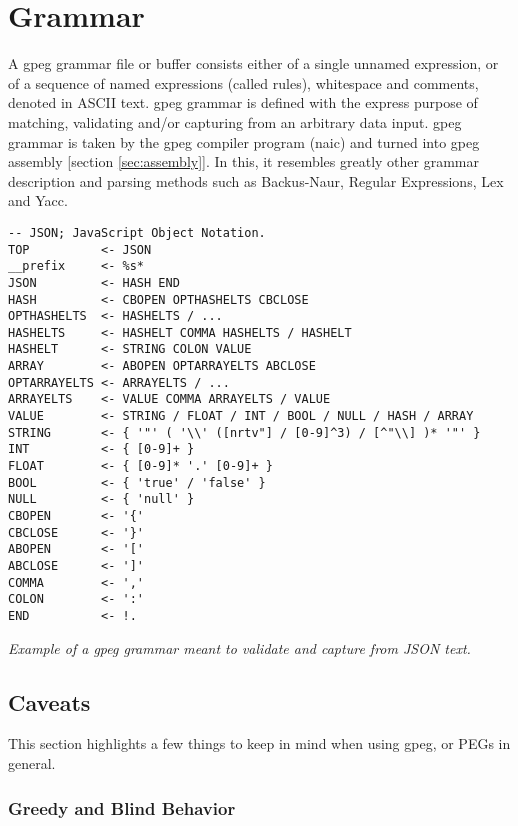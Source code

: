 \section{Grammar}
\label{sec:grammar}

A gpeg grammar file or buffer consists either of a single
unnamed expression, or of a sequence of named expressions (called rules),
whitespace and comments, denoted in ASCII text.
gpeg grammar is defined with the express purpose of matching, validating
and/or capturing from an arbitrary data input.
gpeg grammar is taken by the gpeg compiler program (naic) and turned
into gpeg assembly [section \ref{sec:assembly}].
In this, it resembles greatly other grammar description and parsing methods
such as Backus-Naur, Regular Expressions, Lex and Yacc.

\begin{myquote}
\begin{verbatim}
-- JSON; JavaScript Object Notation.
TOP          <- JSON
__prefix     <- %s*
JSON         <- HASH END
HASH         <- CBOPEN OPTHASHELTS CBCLOSE
OPTHASHELTS  <- HASHELTS / ...
HASHELTS     <- HASHELT COMMA HASHELTS / HASHELT
HASHELT      <- STRING COLON VALUE
ARRAY        <- ABOPEN OPTARRAYELTS ABCLOSE
OPTARRAYELTS <- ARRAYELTS / ...
ARRAYELTS    <- VALUE COMMA ARRAYELTS / VALUE
VALUE        <- STRING / FLOAT / INT / BOOL / NULL / HASH / ARRAY
STRING       <- { '"' ( '\\' ([nrtv"] / [0-9]^3) / [^"\\] )* '"' }
INT          <- { [0-9]+ }
FLOAT        <- { [0-9]* '.' [0-9]+ }
BOOL         <- { 'true' / 'false' }
NULL         <- { 'null' }
CBOPEN       <- '{'
CBCLOSE      <- '}'
ABOPEN       <- '['
ABCLOSE      <- ']'
COMMA        <- ','
COLON        <- ':'
END          <- !.
\end{verbatim}
\end{myquote}
\textit{Example of a gpeg grammar meant to validate and capture from
JSON\cite{bib:json} text.}

\subsection{Caveats}

This section highlights a few things to keep in mind when using
gpeg, or PEGs in general.

\subsubsection{Greedy and Blind Behavior}


